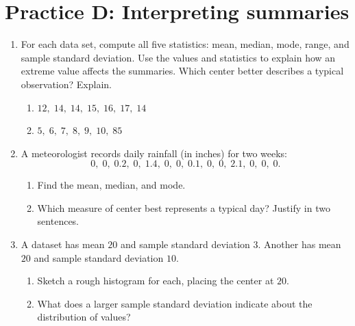 \section*{Practice D: Interpreting summaries}
\begin{enumerate}[label=D\arabic*.,leftmargin=2.5em,itemsep=10pt]
  \item For each data set, compute all five statistics:
    mean, median, mode, range, and sample standard deviation.
    Use the values and statistics to explain how an extreme value affects the summaries. Which center better describes a typical observation? Explain.
    \begin{enumerate}[label=(\alph*), itemsep=6pt]
      \item $12,\; 14,\; 14,\; 15,\; 16,\; 17,\; 14$
      \item $5,\; 6,\; 7,\; 8,\; 9,\; 10,\; 85$
    \end{enumerate}

  \item A meteorologist records daily rainfall (in inches)
    for two weeks:
    \[ 0,\; 0,\; 0.2,\; 0,\; 1.4,\; 0,\; 0,\;
       0.1,\; 0,\; 0,\; 2.1,\; 0,\; 0,\; 0. \]
    \begin{enumerate}[label=(\alph*), itemsep=4pt]
      \item Find the mean, median, and mode.
      \item Which measure of center best represents a
        typical day?
        Justify in two sentences.
    \end{enumerate}

  \item A dataset has mean $20$ and sample standard deviation $3$.
    Another has mean $20$ and sample standard deviation $10$.
    \begin{enumerate}[label=(\alph*), itemsep=4pt]
      \item Sketch a rough histogram for each,
        placing the center at $20$.
      \item What does a larger sample standard deviation indicate
        about the distribution of values?
    \end{enumerate}

\end{enumerate}

